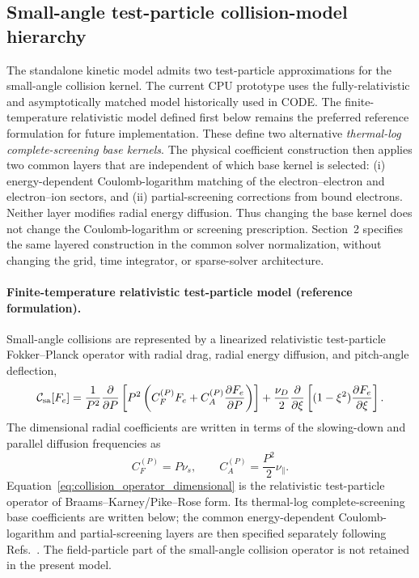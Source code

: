 \documentclass[11pt]{article}
\begin{document}
\subsection{Small-angle test-particle collision-model hierarchy}

The standalone kinetic model admits two test-particle approximations for the
small-angle collision kernel.  The current CPU prototype uses the fully-relativistic
and asymptotically matched model historically used in CODE.  The finite-temperature
relativistic model defined first below remains the preferred reference formulation for
future implementation.  These define two alternative
\emph{thermal-log complete-screening base kernels}.  The physical coefficient construction
then applies two common layers that are independent of which base kernel is selected:
(i) energy-dependent Coulomb-logarithm matching of the electron--electron and
electron--ion sectors, and (ii) partial-screening corrections from bound electrons.
Neither layer modifies radial energy diffusion.  Thus changing the base kernel does not
change the Coulomb-logarithm or screening prescription.  Section~2 specifies the same
layered construction in the common solver normalization, without changing the grid, time
integrator, or sparse-solver architecture.

\paragraph{Finite-temperature relativistic test-particle model (reference formulation).}
Small-angle collisions are represented by a linearized relativistic test-particle
Fokker--Planck operator with radial drag, radial energy diffusion, and pitch-angle
deflection,
\begin{equation}
 \mathcal C_{\rm sa}[F_e]
 =\frac{1}{P^2}\frac{\partial}{\partial P}
  \left[
   P^2\left(
      C_F^{(P)} F_e
      + C_A^{(P)}\frac{\partial F_e}{\partial P}
   \right)
  \right]
 +\frac{\nu_D}{2}\frac{\partial}{\partial\xi}
  \left[(1-\xi^2)\frac{\partial F_e}{\partial\xi}\right].
 \label{eq:collision_operator_dimensional}
\end{equation}
The dimensional radial coefficients are written in terms of the slowing-down and
parallel diffusion frequencies as
\begin{equation}
 C_F^{(P)}=P\nu_s,
 \qquad
 C_A^{(P)}=\frac{P^2}{2}\nu_\parallel.
 \label{eq:dimensional_collision_coeffs}
\end{equation}
Equation~\eqref{eq:collision_operator_dimensional} is the relativistic test-particle
operator of Braams--Karney/Pike--Rose form.  Its thermal-log complete-screening base
coefficients are written below; the common energy-dependent Coulomb-logarithm and
partial-screening layers are then specified separately following
Refs.~\cite{BraamsKarney1989,PikeRose2014,Hesslow2018Collision}.
The field-particle part of the small-angle collision operator is not retained in the
present model.
\end{document}
